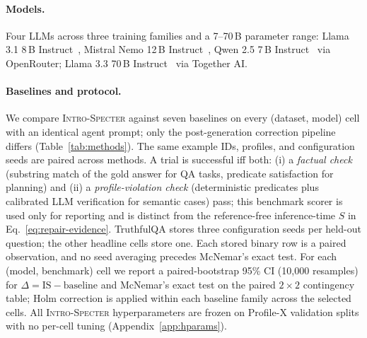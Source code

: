 \documentclass{article}
\newcommand{\method}{\textsc{Intro-Specter}\xspace}
\begin{document}
\paragraph{Models.} Four LLMs across three training families and a 7--70\,B parameter range: Llama 3.1 8\,B Instruct~\citep{dubey2024llama3}, Mistral Nemo 12\,B Instruct~\citep{jiang2023mistral}, Qwen 2.5 7\,B Instruct~\citep{yang2024qwen2.5} via OpenRouter; Llama 3.3 70\,B Instruct~\citep{dubey2024llama3} via Together AI.

\paragraph{Baselines and protocol.} We compare \method against seven baselines on every (dataset, model) cell with an identical agent prompt; only the post-generation correction pipeline differs (Table~\ref{tab:methods}). The same example IDs, profiles, and configuration seeds are paired across methods. A trial is successful iff both: (i) a \emph{factual check} (substring match of the gold answer for QA tasks, predicate satisfaction for planning) and (ii) a \emph{profile-violation check} (deterministic predicates plus calibrated LLM verification for semantic cases) pass; this benchmark scorer is used only for reporting and is distinct from the reference-free inference-time $S$ in Eq.~\ref{eq:repair-evidence}. TruthfulQA stores three configuration seeds per held-out question; the other headline cells store one. Each stored binary row is a paired observation, and no seed averaging precedes McNemar's exact test. For each (model, benchmark) cell we report a paired-bootstrap 95\% CI (10{,}000 resamples) for $\Delta = \text{IS} - \text{baseline}$ and McNemar's exact test on the paired $2{\times}2$ contingency table; Holm correction is applied within each baseline family across the selected cells. All \method hyperparameters are frozen on Profile-X validation splits with no per-cell tuning (Appendix~\ref{app:hparams}).
\end{document}
